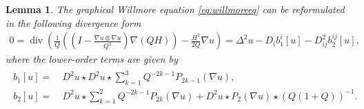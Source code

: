 \documentclass[12pt,a4paper,twoside]{article}
\renewcommand{\div}{\operatorname{div}}
\newtheorem{lemma}[thm]{Lemma}
\begin{document}
 \begin{lemma} \label{lem:willrewriten}
 The graphical Willmore equation \eqref{eq:willmoreeq} can be reformulated in the following divergence form
 \begin{align}
     0= \div \left( \frac{1}{Q} \left( \left(I-\frac{\nabla u \otimes \nabla u }{Q^2}
\right) \nabla (Q H) \right) - \frac{H^2 }{2Q} \nabla u\right)
= \Delta^2 u - D_{i} b^{i}_1[u] - D^2_{ij} b^{ij}_2[u],  \label{eq:Willmoreellipt}
\end{align}
where the lower-order terms are given by
\begin{align}
\begin{aligned}
b_1[u] =&\ D^2 u \star D^2 u \star \sum_{k=1}^3 Q^{-2k-1}P_{2k-1}(\nabla u),   \\
    b_2[u]=&\ D^2 u \star \sum_{k=1}^2 Q^{-2k-1}P_{2k}(\nabla u) + D^2 u \star P_2 (\nabla u) \star (Q(1+Q))^{-1}. 
\end{aligned}
    \label{eq:bi}
\end{align}
 \end{lemma}
\end{document}
